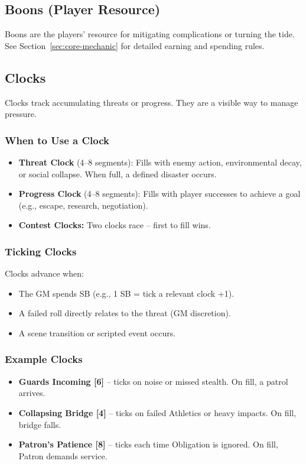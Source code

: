 \subsection{Boons (Player Resource)}

Boons are the players' resource for mitigating complications or turning the tide. See Section~\ref{sec:core-mechanic} for detailed earning and spending rules.

\subsection{Clocks}

Clocks track accumulating threats or progress. They are a visible way to manage pressure.

\subsubsection{When to Use a Clock}
\begin{itemize}
  \item \textbf{Threat Clock} (4–8 segments): Fills with enemy action, environmental decay, or social collapse. When full, a defined disaster occurs.
  \item \textbf{Progress Clock} (4–8 segments): Fills with player successes to achieve a goal (e.g., escape, research, negotiation).
  \item \textbf{Contest Clocks:} Two clocks race – first to fill wins.
\end{itemize}

\subsubsection{Ticking Clocks}
Clocks advance when:
\begin{itemize}
  \item The GM spends SB (e.g., 1 SB = tick a relevant clock +1).
  \item A failed roll directly relates to the threat (GM discretion).
  \item A scene transition or scripted event occurs.
\end{itemize}

\subsubsection{Example Clocks}
\begin{itemize}
  \item \textbf{Guards Incoming [6]} – ticks on noise or missed stealth. On fill, a patrol arrives.
  \item \textbf{Collapsing Bridge [4]} – ticks on failed Athletics or heavy impacts. On fill, bridge falls.
  \item \textbf{Patron's Patience [8]} – ticks each time Obligation is ignored. On fill, Patron demands service.
\end{itemize}


